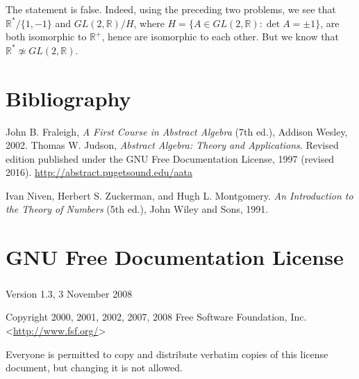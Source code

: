 \documentclass[10pt,]{book}
\theoremstyle{plain}
\theoremstyle{definition}
\theoremstyle{definition}
\theoremstyle{definition}
\theoremstyle{definition}
\numberwithin{equation}{section}
\def\R{\mathbb{R}}
\begin{document}
      The statement is false. Indeed, using the preceding two problems, we see that \(\R^*/\{1,-1\}\) and \(GL(2,\R)/H\),
      where \(H=\{A\in GL(2,\R):\det A =\pm 1\}\), are both isomorphic
      to \(\R^+\), hence are isomorphic to each other. But we know that
      \(\R^* \not\simeq GL(2,\R)\).
\par\smallskip
\typeout{************************************************}
\typeout{************************************************}
\chapter[{Bibliography}]{Bibliography}\label{references-1}
\begin{referencelist}
\hypertarget{F}{}John B. Fraleigh, \textit{A First Course in Abstract Algebra} (7th ed.), Addison Wesley, 2002.
\hypertarget{J}{}Thomas W. Judson, \textit{Abstract Algebra: Theory and Applications}. Revised edition published under the GNU Free
Documentation License, 1997 (revised 2016). 
\href{http://abstract.pugetsound.edu/aata}{http://abstract.pugetsound.edu/aata}

\hypertarget{NZM}{}Ivan Niven, Herbert S. Zuckerman, and Hugh L.
Montgomery. \textit{An Introduction to the Theory of Numbers} (5th
ed.), John Wiley and Sons, 1991.


\end{referencelist}
\typeout{************************************************}
\typeout{************************************************}
\chapter[{GNU Free Documentation License}]{GNU Free Documentation License}\label{appendix-gfdl}
\typeout{************************************************}
\typeout{************************************************}
\paragraph[{}]{}\hypertarget{paragraphs-1}{}
Version 1.3, 3 November 2008%
\par
Copyright \textcopyright{} 2000, 2001, 2002, 2007, 2008 Free Software Foundation, Inc. \textless{}\url{http://www.fsf.org/}\textgreater{}%
\par
Everyone is permitted to copy and distribute verbatim copies of this license document, but changing it is not allowed.%
\typeout{************************************************}
\typeout{************************************************}
\end{document}
